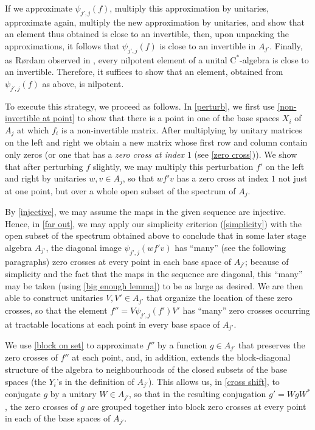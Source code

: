 \documentclass[12pt]{amsart}
\numberwithin{equation}{section}
\theoremstyle{definition}
\theoremstyle{remark}
\begin{document}
If we approximate $\psi_{j',j}(f)$, multiply this approximation by unitaries, approximate again, multiply the new approximation by unitaries, and show that an element thus obtained is close to an invertible, then, upon unpacking the approximations, it follows that $\psi_{j',j}(f)$ is close to an invertible in $A_{j'}$. Finally, as R\o rdam observed in \cite{Ror}, every nilpotent element of a unital $\mathrm{C}^*$-algebra is close to an invertible. Therefore, it suffices to show that an element, obtained from $\psi_{j',j}(f)$ as above, is nilpotent. 

To execute this strategy, we proceed as follows. In \autoref{perturb}, we first use \autoref{non-invertible at point} to show that there is a point in one of the base spaces $X_{i}$ of $A_{j}$ at which $f_{i}$ is a non-invertible matrix. After multiplying by unitary matrices on the left and right we obtain a new matrix whose first row and column contain only zeros (or one that has a \textit{zero cross at index $1$} (see \autoref{zero cross})). We show that after perturbing $f$ slightly, we may multiply this perturbation $f'$ on the left and right by unitaries $w,v\in A_{j}$, so that $wf'v$ has a zero cross at index $1$ not just at one point, but over a whole open subset of the spectrum of $A_{j}$.

By \autoref{injective}, we may assume the maps in the given sequence are injective. Hence, in \autoref{far out}, we may apply our simplicity criterion (\autoref{simplicity}) with the open subset of the spectrum obtained above to conclude that in some later stage algebra $A_{j'}$, the diagonal image $\psi_{j',j}(wf'v)$ has ``many'' (see the following paragraphs) zero crosses at every point in each base space of $A_{j'}$; because of simplicity and the fact that the maps in the sequence are diagonal, this ``many'' may be taken (using \autoref{big enough lemma}) to be as large as desired. We are then able to construct unitaries $V,V'\in A_{j'}$ that organize the location of these zero crosses, so that the element $f''=V\psi_{j',j}(f')V'$ has ``many'' zero crosses occurring at tractable locations at each point in every base space of $A_{j'}$. 

We use \autoref{block on set} to approximate $f''$ by a function $g\in A_{j'}$ that preserves the zero crosses of $f''$ at each point, and, in addition, extends the block-diagonal structure of the algebra to neighbourhoods of the closed subsets of the base spaces (the $Y_{i}$'s in the definition of $A_{j'}$). This allows us, in \autoref{cross shift}, to conjugate $g$ by a unitary $W\in A_{j'}$, so that in the resulting conjugation $g'=WgW^{*}$, the zero crosses of $g$ are grouped together into block zero crosses at every point in each of the base spaces of $A_{j'}$.
\end{document}
